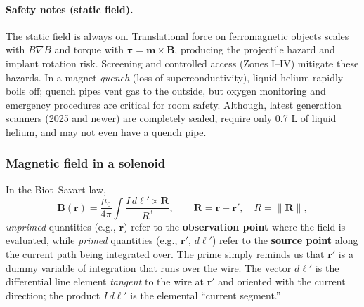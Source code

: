 \documentclass[12pt]{article}
\begin{document}
{\paragraph{Safety notes (static field).}
The static field is always on. Translational force on ferromagnetic objects scales with $B\nabla B$ and torque with $\boldsymbol{\tau}=\mathbf{m}\times\mathbf{B}$, producing the projectile hazard and implant rotation risk. Screening and controlled access (Zones I–IV) mitigate these hazards. In a magnet \emph{quench} (loss of superconductivity), liquid helium rapidly boils off; quench pipes vent gas to the outside, but oxygen monitoring and emergency procedures are critical for room safety. Although, latest generation scanners (2025 and newer) are completely sealed, require only 0.7 L of liquid helium, and may not even have a quench pipe. 

\subsubsection{Magnetic field in a solenoid}
In the Biot--Savart law,
\[
\mathbf{B}(\mathbf{r})=\frac{\mu_0}{4\pi}\int \frac{I\, d\boldsymbol{\ell}'\times\mathbf{R}}{R^3},
\qquad
\mathbf{R}=\mathbf{r}-\mathbf{r}',\quad R=\lVert\mathbf{R}\rVert,
\]
\emph{unprimed} quantities (e.g., $\mathbf{r}$) refer to the \textbf{observation point} where the field is evaluated, while \emph{primed} quantities (e.g., $\mathbf{r}'$, $d\boldsymbol{\ell}'$) refer to the \textbf{source point} along the current path being integrated over. The prime simply reminds us that $\mathbf{r}'$ is a dummy variable of integration that runs over the wire. The vector $d\boldsymbol{\ell}'$ is the differential line element \emph{tangent} to the wire at $\mathbf{r}'$ and oriented with the current direction; the product $I\,d\boldsymbol{\ell}'$ is the elemental ``current segment.''

}
\end{document}

